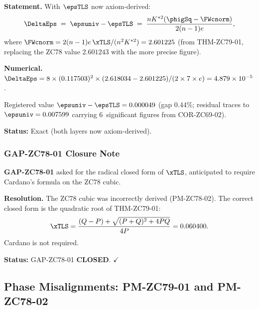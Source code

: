 \documentclass[12pt, a4paper]{article}
\begin{document}
\begin{formalbox}[title={COR-ZC79-02: $\DeltaEps$ Updated
  ($R_0$, Exact)}]

\textbf{Statement.}
With $\epsTLS$ now axiom-derived:
\begin{equation}
  \DeltaEps
  \;=\;
  \epsuniv - \epsTLS
  \;=\;
  \frac{n K^{*2}(\phigSq - \FWcnorm)}{2(n-1)e},
  \label{eq:deltaeps}
\end{equation}
where $\FWcnorm = 2(n-1)e\,\xTLS/(n^2K^{*2}) = 2.601225$
(from THM-ZC79-01, replacing the ZC78 value $2.601243$
with the more precise figure).

\textbf{Numerical.}
$\DeltaEps = 8 \times (0.117503)^2 \times (2.618034 - 2.601225)
/ (2 \times 7 \times e) = 4.879 \times 10^{-5}$.

Registered value $\epsuniv - \epsTLS = 0.000049$ (gap $0.44\%$;
residual traces to $\epsuniv = 0.007599$ carrying 6~significant
figures from COR-ZC69-02).

\textbf{Status:} Exact (both layers now axiom-derived).
\end{formalbox}

\subsubsection{GAP-ZC78-01 Closure Note}
\label{sec:gap7801}

\begin{formalbox}[title={GAP-ZC78-01 --- \textbf{CLOSED}
  via THM-ZC79-01}]

\textbf{GAP-ZC78-01} asked for the radical closed form of $\xTLS$,
anticipated to require Cardano's formula on the ZC78 cubic.

\textbf{Resolution.}
The ZC78 cubic was incorrectly derived (PM-ZC78-02). The correct
closed form is the quadratic root of THM-ZC79-01:
\[
  \xTLS
  = \frac{(Q-P)+\sqrt{(P+Q)^2+4PQ}}{4P}
  = 0.060400.
\]
Cardano is not required.

\textbf{Status:} GAP-ZC78-01 \textbf{CLOSED}. $\checkmark$
\end{formalbox}

\subsection{Phase Misalignments: PM-ZC79-01 and PM-ZC78-02}
\label{sec:pm}
\end{document}
